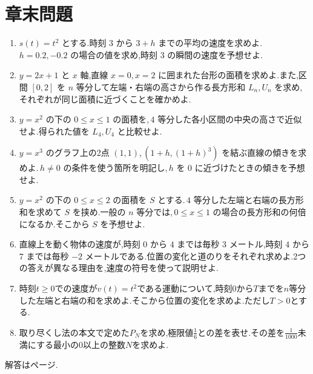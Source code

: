 \clearpage
\section*{章末問題}
\begin{enumerate}[label=\textbf{\thechapter.\arabic*},leftmargin=*]
 \item\label{問:導入速度} $s(t)=t^2$ とする.時刻 $3$ から $3+h$ までの平均の速度を求めよ.\,$h=0.2,-0.2$ の場合の値を求め,時刻 $3$ の瞬間の速度を予想せよ.
 \item\label{問:導入直線面積} $y=2x+1$ と $x$ 軸,直線 $x=0,x=2$ に囲まれた台形の面積を求めよ.また,区間 $[0,2]$ を $n$ 等分して左端・右端の高さから作る長方形和 $L_n,U_n$ を求め,それぞれが同じ面積に近づくことを確かめよ.
 \item\label{問:導入中点} $y=x^2$ の下の $0\le x\le1$ の面積を,\,$4$ 等分した各小区間の中央の高さで近似せよ.得られた値を $L_4,U_4$ と比較せよ.
 \item\label{問:導入三次割線} $y=x^3$ のグラフ上の2点 $(1,1)$,\,$(1+h,(1+h)^3)$ を結ぶ直線の傾きを求めよ.\,$h\ne0$ の条件を使う箇所を明記し,\,$h$ を $0$ に近づけたときの傾きを予想せよ.
 \item\label{問:導入拡大面積} $y=x^2$ の下の $0\le x\le2$ の面積を $S$ とする.\,$4$ 等分した左端と右端の長方形和を求めて $S$ を挟め.一般の $n$ 等分では,\,$0\le x\le1$ の場合の長方形和の何倍になるか.そこから $S$ を予想せよ.
 \item\label{問:導入符号} 直線上を動く物体の速度が,時刻 $0$ から $4$ までは毎秒 $3$ メートル,時刻 $4$ から $7$ までは毎秒 $-2$ メートルである.位置の変化と道のりをそれぞれ求めよ.2つの答えが異なる理由を,速度の符号を使って説明せよ.
 \item\label{問:導入二次速度} 時刻$t\ge0$での速度が$v(t)=t^2$である運動について,時刻$0$から$T$までを$n$等分した左端と右端の和を求めよ.そこから位置の変化を求めよ.ただし$T>0$とする.
 \item\label{問:導入三角形和} 取り尽くし法の本文で定めた$P_N$を求め,極限値$\frac16$との差を表せ.その差を$\frac1{1000}$未満にする最小の$0$以上の整数$N$を求めよ.
\end{enumerate}

\smallskip\noindent 解答は\pageref{解答:第1章}ページ.

